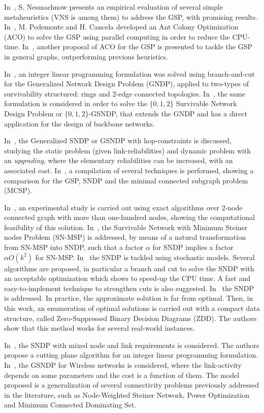 In~\cite{67,28}, S. Nesmachnow presents an empirical evaluation of several simple metaheuristics (VNS is among them) to address the GSP, with promising results. In~\cite{68}, M. Pedemonte and H. Cancela developed an Ant Colony Optimization (ACO) to solve the GSP using parallel computing in order 
to reduce the CPU-time. In~\cite{71}, another proposal of ACO for the GSP is presented to tackle the GSP 
in general graphs, outperforming previous heuristics.

In~\cite{69,77}, an integer linear programming formulation was solved using branch-and-cut for 
the Generalized Network Design Problem (GNDP), applied to two-types of survivability structured: rings and 
2-edge connected topologies. In~\cite{73}, the same formulation is considered in order to solve the 
 $\{0,1,2\}$ Survivable Network Design Problem or $\{0,1,2\}$-GSNDP, that extends the GNDP and 
 has a direct application for the design of backbone networks.

In~\cite{70}, the Generalized SNDP or GSNDP with hop-constraints is discussed, studying 
the static problem (given link-reliabilities) and dynamic problem with an \emph{upgrading}, 
where the elementary reliabilities can be increased, with an associated cost. In~\cite{72}, a compilation of 
several techniques is performed, showing a comparison for the GSP, SNDP and the minimal connected subgraph problem (MCSP).

In~\cite{74}, an experimental study is carried out using exact algorithms over 2-node connected graph with 
more than one-hundred nodes, showing the computational feasibility of this solution. In~\cite{75}, 
the Survivable Network with Minimum Steiner nodes Problem (SN-MSP) is addressed, by means of a natural transformation from SN-MSP into SNDP, such that a factor $\alpha$ for SNDP implies a 
factor $\alpha O(k^2)$ for SN-MSP. In~\cite{76} the SNDP is tackled using stochastic models. 
Several algorithms are proposed, in particular a branch and cut to solve the SNDP with an acceptable optimization which shows to speed-up the CPU time. A fast and easy-to-implement technique to strengthen cuts is also suggested.
In~\cite{99} the SNDP is addressed. In practice, the approximate solution is far from optimal. Then, in this work, 
an enumeration of optimal solutions is carried out with a compact data structure, called 
Zero-Suppressed Binary Decision Diagrams (ZDD). The authors show that this method works for several real-world 
instances.

In~\cite{100}, the SNDP with mixed node and link requirements is considered. The authors propose a 
cutting plane algorithm for an integer linear programming formulation. 
In~\cite{101}, the GSNDP for Wireless networks is considered, where the link-activity depends on some parameters and the cost is a function of them. The model proposed is a generalization of several connectivity problems 
previously addressed in the literature, such as Node-Weighted Steiner Network, Power Optimization and Minimum Connected Dominating Set.

